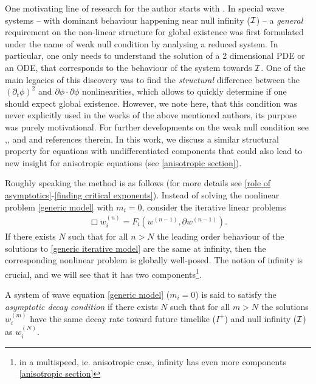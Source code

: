 \documentclass[11pt, oneside]{amsart}
\begin{document}
	One motivating line of research for the author starts with \cite{lindblad_weak_2003}. In special wave systems -- with dominant behaviour happening near null infinity ($\mathcal{I}$) -- a \textit{general} requirement on the non-linear structure for global existence was first formulated under the name of weak null condition by analysing a reduced system.  In particular, one only needs to understand the solution of a 2 dimensional PDE or an ODE, that corresponds to the behaviour of the system towards $\mathcal{I}$. One of the main legacies of this discovery was to find the \textit{structural} difference between the $(\partial_t\phi)^2$ and $\partial\phi\cdot\partial\phi$ nonlinearities,  which allows to quickly determine if one should expect global existence. However, we note here, that this condition was never explicitly used in the works of the above mentioned authors, its purpose was purely motivational. For further developments on the weak null condition see \cite{alinhac_semilinear_2006},\cite{keir_weak_2018}, \cite{deng_global_2018} and \cite{keir_global_2019} and references therein. In this work, we discuss a similar structural property for equations with undifferentiated components that could also lead to new insight for anisotropic equations (see \cref{anisotropic section}).
	
	\begin{idea}\label{idea}
		Roughly speaking the method is as follows (for more details see \cref{role of asymptotics}-\cref{finding critical exponents}). Instead of solving the nonlinear problem  \eqref{generic model} with $m_i=0$, consider the iterative linear problems
		\begin{equation}\label{generic iterative model}
			\begin{gathered}
				\Box w^{(n)}_i=F_i(w^{(n-1)},\partial w^{(n-1)}).
			\end{gathered}
		\end{equation}
		If there exists $N$ such that for all $n>N$ the leading order behaviour of the solutions to \eqref{generic iterative model} are the same at infinity, then the corresponding nonlinear problem is globally well-posed. The notion of infinity is crucial, and we will see that it has two components\footnote{in a multispeed, ie. anisotropic case, infinity has even more components \cref{anisotropic section}}.
	\end{idea}

	\begin{definition}\label{asymptotic decay condition}
		A system of wave equation \cref{generic model} ($m_i=0$) is said to satisfy the \textit{asymptotic decay condition} if there exists $N$ such that for all $m>N$ the solutions $w^{(m)}_i$ have the same decay rate toward future timelike ($I^+$) and null infinity ($\mathcal{I}$) as $w^{(N)}_i$.
	\end{definition}
	
\end{document}
